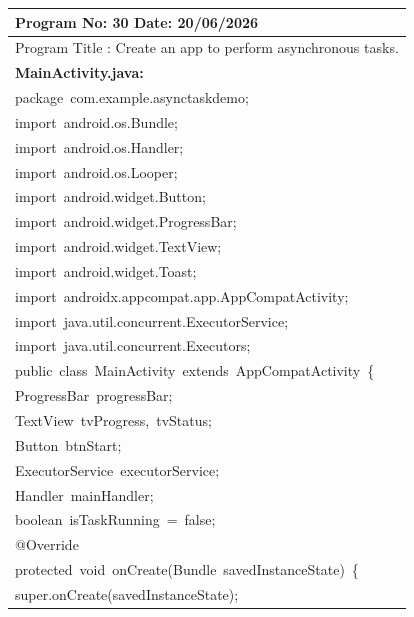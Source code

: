 \documentclass[a4paper,12pt]{article}
\begin{document}
\newpage

\noindent\begingroup
\renewcommand{\arraystretch}{1.1}
\begin{longtable}{|p{}|}
\hline\endfirsthead\hline\endhead\hline\endfoot\hline\endlastfoot
\rule{0pt}{13pt}Program No: 30 \hfill Date: 20/06/2026 \\
\hline
\rule{0pt}{13pt}Program Title : Create an app to perform asynchronous tasks. \\
\hline
\rule{0pt}{13pt}\textbf{MainActivity.java:} \\
\hline
{\ttfamily\small package\ com.example.asynctaskdemo;} \\
{\ttfamily\small import\ android.os.Bundle;} \\
{\ttfamily\small import\ android.os.Handler;} \\
{\ttfamily\small import\ android.os.Looper;} \\
{\ttfamily\small import\ android.widget.Button;} \\
{\ttfamily\small import\ android.widget.ProgressBar;} \\
{\ttfamily\small import\ android.widget.TextView;} \\
{\ttfamily\small import\ android.widget.Toast;} \\
{\ttfamily\small import\ androidx.appcompat.app.AppCompatActivity;} \\
{\ttfamily\small import\ java.util.concurrent.ExecutorService;} \\
{\ttfamily\small import\ java.util.concurrent.Executors;} \\
{\ttfamily\small public\ class\ MainActivity\ extends\ AppCompatActivity\ \{} \\
{\ttfamily\small ProgressBar\ progressBar;} \\
{\ttfamily\small TextView\ tvProgress,\ tvStatus;} \\
{\ttfamily\small Button\ btnStart;} \\
{\ttfamily\small ExecutorService\ executorService;} \\
{\ttfamily\small Handler\ mainHandler;} \\
{\ttfamily\small boolean\ isTaskRunning\ =\ false;} \\
{\ttfamily\small @Override} \\
{\ttfamily\small protected\ void\ onCreate(Bundle\ savedInstanceState)\ \{} \\
{\ttfamily\small super.onCreate(savedInstanceState);} \\

\end{longtable}
\end{document}
